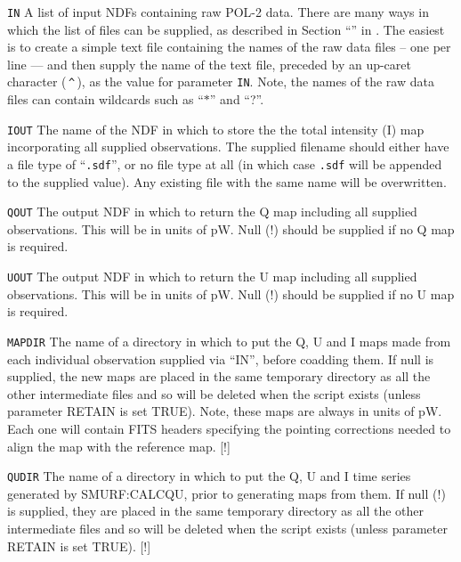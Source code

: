 \begin{aligndesc}
\item[\texttt{IN}] A list of input NDFs containing raw POL-2 data.
There are many ways in which the list of files can be supplied,
as described in Section ``''
in . The easiest is to create a simple text
file containing the names of the raw data files -- one per line --- and
then supply the name of the text file, preceded by an up-caret character
(\,\texttt{\^{}}\,), as the value for parameter \texttt{IN}. Note, the names of
the raw data files can contain wildcards such as ``$*$'' and ``?''.

\item[\texttt{IOUT}]
The name of the NDF in which to store the the total intensity (I) map
incorporating all supplied observations. The supplied filename should either have a file type of
``\texttt{.sdf}'', or no file type at all (in which case \texttt{.sdf}
will be appended to the supplied value). Any existing file with the same
name will be overwritten.

\item[\texttt{QOUT}]
The output NDF in which to return the Q map including all supplied
observations. This will be in units of pW. Null (!) should be supplied if no Q
map is required.


\item[\texttt{UOUT}]
The output NDF in which to return the U map including all supplied
observations. This will be in units of pW. Null (!) should be supplied if no U
map is required.

\item[\texttt{MAPDIR}]
The name of a directory in which to put the Q, U and I maps made
from each individual observation supplied via ``IN'', before
coadding them. If
null is supplied, the new maps are placed in the same temporary
directory as all the other intermediate files and so will be
deleted when the script exists (unless parameter RETAIN is set
TRUE). Note, these maps are always in units of pW. Each one will
contain FITS headers specifying the pointing corrections needed
to align the map with the reference map. [!]


\item[\texttt{QUDIR}]
The name of a directory in which to put the Q, U and I time series
generated by SMURF:CALCQU, prior to generating maps from them. If
null (!) is supplied, they are placed in the same temporary directory
as all the other intermediate files and so will be deleted when the
script exists (unless parameter RETAIN is set TRUE). [!]
\end{aligndesc}

